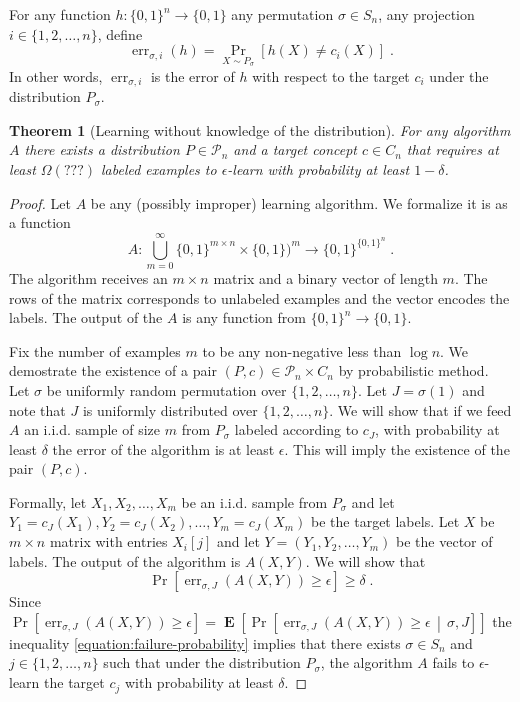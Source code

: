 \documentclass[10pt]{article}
\newtheorem{theorem}[proposition]{Theorem}
\renewcommand{\P}{\mathcal{P}}
\DeclareMathOperator{\err}{err}
\DeclareMathOperator{\Exp}{\mathbf{E}}
\begin{document}
For any function $h:\{0,1\}^n \to \{0,1\}$ any permutation $\sigma \in S_n$, any
projection $i \in \{1,2,\dots,n\}$, define
$$
\err_{\sigma,i}(h) = \Pr_{X \sim P_{\sigma}}[h(X) \neq c_i(X)] \; .
$$
In other words, $\err_{\sigma,i}$ is the error of $h$ with respect to the target
$c_i$ under the distribution $P_{\sigma}$.

\begin{theorem}[Learning without knowledge of the distribution]
For any algorithm $A$ there exists a distribution $P \in \P_n$
and a target concept $c \in C_n$ that requires at least $\Omega \left(??? \right)$
labeled examples to $\epsilon$-learn with probability at least $1 - \delta$.
\end{theorem}

\begin{proof}
Let $A$ be any (possibly improper) learning algorithm. We formalize it is as a function
$$
A:\bigcup_{m=0}^\infty\{0,1\}^{m \times n} \times \{0,1\})^m \to \{0,1\}^{\{0,1\}^n} \; .
$$
The algorithm receives an $m \times n$ matrix and a binary vector of length $m$.
The rows of the matrix corresponds to unlabeled examples and the vector encodes
the labels. The output of the $A$ is any function from $\{0,1\}^n \to \{0,1\}$.

Fix the number of examples $m$ to be any non-negative less than $\log n$. We
demostrate the existence of a pair $(P,c) \in \P_n \times C_n$ by probabilistic
method. Let $\sigma$ be uniformly random permutation over $\{1,2,\dots,n\}$. Let
$J = \sigma(1)$ and note that $J$ is uniformly distributed over
$\{1,2,\dots,n\}$. We will show that if we feed $A$ an i.i.d. sample of size $m$
from $P_\sigma$ labeled according to $c_J$, with probability at least $\delta$
the error of the algorithm is at least $\epsilon$. This will imply the existence
of the pair $(P,c)$.

Formally, let $X_1, X_2, \dots, X_m$ be an i.i.d. sample from $P_{\sigma}$ and
let $Y_1 = c_J(X_1), Y_2 = c_J(X_2), \dots, Y_m = c_J(X_m)$ be the target
labels. Let $X$ be $m \times n$ matrix with entries $X_i[j]$ and let $Y = (Y_1,
Y_2, \dots, Y_m)$ be the vector of labels. The output of the algorithm is $A(X,Y)$.
We will show that
\begin{equation}
\label{equation:failure-probability}
\Pr \left[\err_{\sigma,J}(A(X,Y)) \ge \epsilon \right] \ge \delta \; .
\end{equation}
Since $\Pr \left[\err_{\sigma,J}(A(X,Y)) \ge \epsilon \right] = \Exp\left[ \Pr \left[\err_{\sigma,J}(A(X,Y)) \ge \epsilon \, \middle| \, \sigma, J \right] \right]$
the inequality \eqref{equation:failure-probability} implies that there
exists $\sigma \in S_n$ and $j \in \{1,2,\dots,n\}$ such that under the
distribution $P_\sigma$, the algorithm $A$ fails to $\epsilon$-learn the target
$c_j$ with probability at least $\delta$.


\end{proof}
\end{document}
